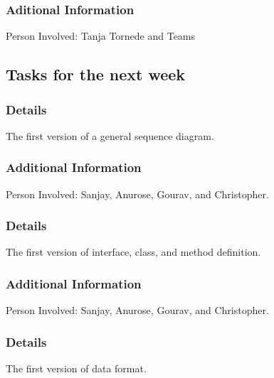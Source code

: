 \documentclass[11pt]{meetingmins} %
\begin{document}
\subsubsection{Aditional Information}
\begin{hiddensubitems}
    \item Person Involved: Tanja Tornede and Teams
\end{hiddensubitems}




\subsection{Tasks for the next week}
\subsubsection{Details}
\begin{hiddensubitems}
    \item The first version of a general sequence diagram.
\end{hiddensubitems}

\subsubsection{Additional Information}
\begin{hiddensubitems}
    \item Person Involved: Sanjay, Anurose, Gourav, and Christopher.
\end{hiddensubitems}

\subsubsection{Details}
\begin{hiddensubitems}
    \item The first version of interface, class, and method definition.
\end{hiddensubitems}

\subsubsection{Additional Information}
\begin{hiddensubitems}
    \item Person Involved: Sanjay, Anurose, Gourav, and Christopher.
\end{hiddensubitems}

\subsubsection{Details}
\begin{hiddensubitems}
    \item The first version of data format.
\end{hiddensubitems}
\end{document}
